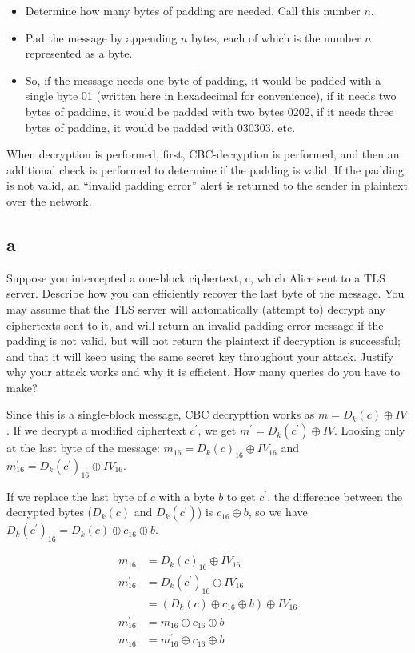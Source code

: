 \documentclass[11pt]{article}
\begin{document}
\begin{itemize}
  \item Determine how many bytes of padding are needed. Call this number $n$.
  \item Pad the message by appending $n$ bytes, each of which is the number $n$ represented as a byte.
  \item So, if the message needs one byte of padding, it would be padded with a single byte 01 (written here in hexadecimal for convenience), if it needs two bytes of padding, it would be padded with two bytes 0202, if it needs three bytes of padding, it would be padded with 030303, etc.
\end{itemize}

When decryption is performed, first, CBC-decryption is performed, and then an additional check is performed to determine if the padding is valid. If the padding is not valid, an “invalid padding error” alert is returned to the sender in plaintext over the network.

\subsection{a}

Suppose you intercepted a one-block ciphertext, c, which Alice sent to a TLS server. Describe how you can efficiently recover the last byte of the message. You may assume that the TLS server will automatically (attempt to) decrypt any ciphertexts sent to it, and will return an invalid padding error message if the padding is not valid, but will not return the plaintext if decryption is successful; and that it will keep using the same secret key throughout your attack. Justify why your attack works and why it is efficient. How many queries do you have to make?

Since this is a single-block message, CBC decrypttion works as $m = D_k(c) \oplus IV$. If we decrypt a modified ciphertext $c^\prime$, we get $m^\prime = D_k(c^\prime) \oplus IV$. Looking only at the last byte of the message: $m_{16} = D_k(c)_{16} \oplus IV_{16}$ and $m^\prime_{16} = D_k(c^\prime)_{16} \oplus IV_{16}$.

If we replace the last byte of $c$ with a byte $b$ to get $c^\prime$, the difference between the decrypted bytes ($D_k(c)$ and $D_k(c^\prime)$) is $c_{16} \oplus b$, so we have $D_k(c^\prime)_{16} = D_k(c) \oplus c_{16} \oplus b$.

\begin{align*}
  m_{16} &= D_k(c)_{16} \oplus IV_{16} \\
  m^\prime_{16} &= D_k(c^\prime)_{16} \oplus IV_{16} \\
  &= (D_k(c) \oplus c_{16} \oplus b) \oplus IV_{16} \\
  m^\prime_{16} &= m_{16} \oplus c_{16} \oplus b \\
  m_{16} &= m^\prime_{16} \oplus c_{16} \oplus b \\
\end{align*}
\end{document}
